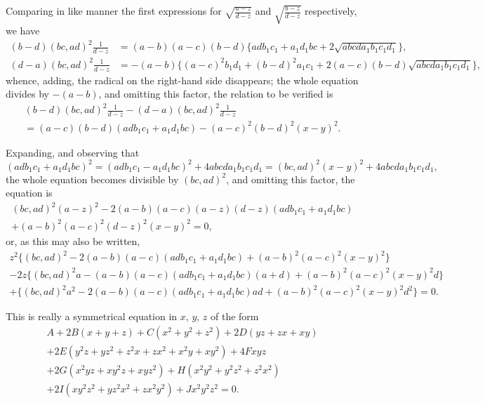 \documentclass[11pt,a4paper]{book}
\begin{document}
Comparing in like manner the first expressions for $\sqrt{\frac{a - z}{d - z}}$ and $\sqrt{\frac{b - z}{d - z}}$ respectively, we have
\begin{align*}
(b - d)(bc, ad)^2 \frac{1}{d - z} &= (a - b)(a - c)(b - d)\{adb_1c_1 + a_1d_1bc + 2\sqrt{abcda_1b_1c_1d_1}\}, \\
(d - a)(bc, ad)^2 \frac{1}{d - z} &= -(a - b)\{(a - c)^2b_1d_1 + (b - d)^2a_1c_1 + 2(a - c)(b - d)\sqrt{abcda_1b_1c_1d_1}\},
\end{align*}
whence, adding, the radical on the right-hand side disappears; the whole equation divides by $-(a - b)$, and omitting this factor, the relation to be verified is
\begin{multline*}
(b - d)(bc, ad)^2 \frac{1}{d - z} - (d - a)(bc, ad)^2 \frac{1}{d - z} \\
= (a - c)(b - d)(adb_1c_1 + a_1d_1bc) - (a - c)^2(b - d)^2(x - y)^2.
\end{multline*}

\clearpage
Expanding, and observing that
\[
(adb_1c_1 + a_1d_1bc)^2 = (adb_1c_1 - a_1d_1bc)^2 + 4abcda_1b_1c_1d_1 = (bc, ad)^2(x - y)^2 + 4abcda_1b_1c_1d_1,
\]
the whole equation becomes divisible by $(bc, ad)^2$, and omitting this factor, the equation is
\begin{multline*}
(bc, ad)^2(a - z)^2 - 2(a - b)(a - c)(a - z)(d - z)(adb_1c_1 + a_1d_1bc) \\
+ (a - b)^2(a - c)^2(d - z)^2(x - y)^2 = 0,
\end{multline*}
or, as this may also be written,
\begin{multline*}
z^2\{(bc, ad)^2 - 2(a - b)(a - c)(adb_1c_1 + a_1d_1bc) + (a - b)^2(a - c)^2(x - y)^2\} \\
- 2z\{(bc, ad)^2a - (a - b)(a - c)(adb_1c_1 + a_1d_1bc)(a + d) + (a - b)^2(a - c)^2(x - y)^2d\} \\
+ \{(bc, ad)^2a^2 - 2(a - b)(a - c)(adb_1c_1 + a_1d_1bc)ad + (a - b)^2(a - c)^2(x - y)^2d^2\} = 0.
\end{multline*}

\clearpage
This is really a symmetrical equation in $x$, $y$, $z$ of the form
\begin{multline*}
A + 2B(x + y + z) + C(x^2 + y^2 + z^2) + 2D(yz + zx + xy) \\
+ 2E(y^2z + yz^2 + z^2x + zx^2 + x^2y + xy^2) + 4Fxyz \\
+ 2G(x^2yz + xy^2z + xyz^2) + H(x^2y^2 + y^2z^2 + z^2x^2) \\
+ 2I(xy^2z^2 + yz^2x^2 + zx^2y^2) + Jx^2y^2z^2 = 0.
\end{multline*}
\end{document}
